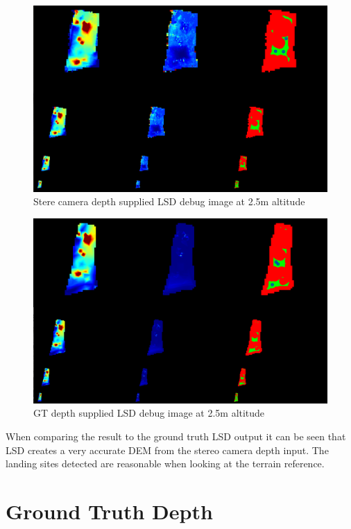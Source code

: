 \begin{figure}[ht!]
    \centering
    \includegraphics[scale=0.25]{images/preparation/stereo_2.5m.png}
    \caption{Stere camera depth supplied LSD debug image at 2.5m altitude}
    \label{qual_stereo_test}
\end{figure}

\clearpage %

\begin{figure}[ht!]
    \centering
    \includegraphics[scale=0.25]{images/preparation/GT_2.5m.png}
    \caption{GT depth supplied LSD debug image at 2.5m altitude}
    \label{stereo_GT}
\end{figure}

When comparing the result to the ground truth LSD output it can be seen that LSD creates a very accurate DEM from the stereo camera depth input. The landing sites detected are reasonable when looking at the terrain reference. 

\section{Ground Truth Depth}

